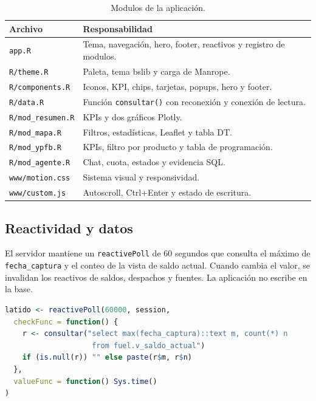 \documentclass[12pt,a4paper]{article}
\newcommand{\archivo}[1]{\texttt{#1}}
\begin{document}
\begin{table}[H]
\centering
\small
\caption{Modulos de la aplicación.}
\label{tab:modulos}
\begin{tabularx}{\linewidth}{@{}l X@{}}
\toprule
\textbf{Archivo} & \textbf{Responsabilidad} \\
\midrule
\archivo{app.R} & Tema, navegación, hero, footer, reactivos y registro de modulos. \\
\archivo{R/theme.R} & Paleta, tema bslib y carga de Manrope. \\
\archivo{R/components.R} & Iconos, KPI, chips, tarjetas, popups, hero y footer. \\
\archivo{R/data.R} & Función \texttt{consultar()} con reconexión y conexión de lectura. \\
\archivo{R/mod\_resumen.R} & KPIs y dos gráficos Plotly. \\
\archivo{R/mod\_mapa.R} & Filtros, estadísticas, Leaflet y tabla DT. \\
\archivo{R/mod\_ypfb.R} & KPIs, filtro por producto y tabla de programación. \\
\archivo{R/mod\_agente.R} & Chat, cuota, estados y evidencia SQL. \\
\archivo{www/motion.css} & Sistema visual y responsividad. \\
\archivo{www/custom.js} & Autoscroll, Ctrl+Enter y estado de escritura. \\
\bottomrule
\end{tabularx}
\end{table}

\subsection{Reactividad y datos}

El servidor mantiene un \texttt{reactivePoll} de 60 segundos que consulta el máximo de \texttt{fecha\_captura} y el conteo de la vista de saldo actual. Cuando cambia el valor, se invalidan los reactivos de saldos, despachos y fuentes. La aplicación no escribe en la base.

\begin{lstlisting}[language=R,caption={Latido de actualizacion de la aplicacion.}]
latido <- reactivePoll(60000, session,
  checkFunc = function() {
    r <- consultar("select max(fecha_captura)::text m, count(*) n
                    from fuel.v_saldo_actual")
    if (is.null(r)) "" else paste(r$m, r$n)
  },
  valueFunc = function() Sys.time()
)
\end{lstlisting}
\end{document}
